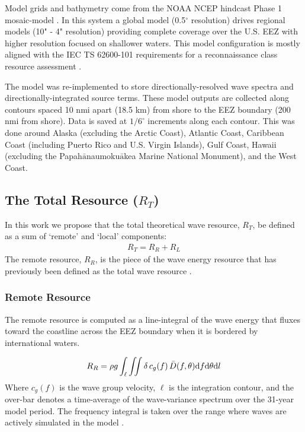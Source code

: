 Model grids and bathymetry come from the NOAA NCEP hindcast Phase 1 mosaic-model \citep{chawla2011wavewatch,chawla201230}. In this system a global model (0.5$^{\circ}$ resolution) drives regional models (10" - 4" resolution) providing complete coverage over the U.S. EEZ with higher resolution focused on shallower waters. This model configuration is mostly aligned with the IEC TS 62600-101 requirements for a reconnaissance class resource assessment \citep{internationalelectrotechnicalcommissionPart101Wave2015}.

The model was re-implemented to store directionally-resolved wave spectra and directionally-integrated source terms. These model outputs are collected along contours spaced 10 nmi apart (18.5 km) from shore to the EEZ boundary (200 nmi from shore). Data is saved at $1/6^\circ$ increments along each contour. This was done around Alaska (excluding the Arctic Coast), Atlantic Coast, Caribbean Coast (including Puerto Rico and U.S. Virgin Islands), Gulf Coast, Hawaii (excluding the Papah$\bar{\text{a}}$naumoku$\bar{\text{a}}$kea Marine National Monument), and the West Coast. 

\subsection{The Total Resource ($R_T$) \label{sec:method:calc}}

In this work we propose that the total theoretical wave resource, $R_T$, be defined as a sum of `remote' and `local' components:
\begin{align}
  R_T = R_R + R_L
\end{align}
The remote resource, $R_R$, is the piece of the wave energy resource that has previously been defined as the total wave resource \citep{gunnQuantifyingGlobalWave2012, EPRIwaveresource2011}.%

\subsubsection{Remote Resource} \label{sec:method:calc:remote}

The remote resource is computed as a line-integral of the wave energy that fluxes toward the coastline across the EEZ boundary when it is bordered by international waters. 

\begin{align}
  R_R = \rho g \int_{\ell}\iint \delta \, c_g(f) \, \bar{D}(f,\theta) \mathrm{d} f \mathrm{d} \theta \mathrm{d} l
\label{eqn:RR}
\end{align}
Where $c_g(f)$ is the wave group velocity, $\ell$ is the integration contour, and
the over-bar denotes a time-average of the wave-variance spectrum over the 31-year model period. The frequency integral is taken over the range where waves are actively simulated in the model \citep[up to $0.5$ Hz,][]{ardhuinObservationSwellDissipation2009}.

